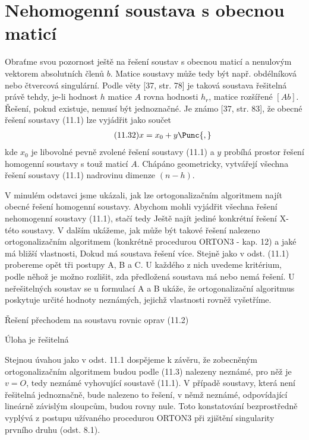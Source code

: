\section{Nehomogenní soustava s obecnou maticí}

Obraťme svou pozornost ještě na řešení soustav s obecnou
maticí \Amxn a nenulovým vektorem absolutních členů $b$. Matice
soustavy může tedy být např. obdélníková nebo čtvercová
singulární. Podle  věty [37, str. 78] je taková soustava
řešitelná právě tehdy, je-li hodnost $h$ matice $A$ rovna hodnosti
$h_r$, matice rozšířené $[A b]$. Řešení, pokud existuje, nemusí
být jednoznačné. Je známo [37, str. 83], že obecné řešení
soustavy (11.1) lze vyjádřit jako součet
%
\begin{align*}
  \tag{11.32}
  x = x_0 + y \Punc{,}
\end{align*}
%
kde $x_0$ je libovolné pevně zvolené řešení soustavy (11.1) a $y$
probíhá prostor řešení homogenní soustavy s touž maticí $A$.
Chápáno geometricky, vytvářejí všechna řešení soustavy (11.1)
nadrovinu dimenze $(n-h)$.

V minulém odstavci jsme ukázali, jak lze ortogonalizačním
algoritmem najít obecné řešení homogenní soustavy. Abychom mohli
%
vyjádřit  všechna řešení nehomogenní soustavy (11.1), stačí
tedy Ještě najít jediné konkrétní řešení X- této soustavy.
V dalším ukážeme, jak může být takové řešení nalezeno
ortogonalizačním algoritmem (konkrétně procedurou ORTON3 - kap. 12)
a jaké má bližší vlastnosti, Dokud má soustava řešení více. Stejně
jako v odst. (11.1) probereme opět tři postupy A, B a C. U každého
z nich uvedeme kritérium, podle něhož je možno rozlišit, zda
předložená soustava má nebo nemá řešení. U neřešitelných
soustav se u formulací A a B ukáže, že ortogonalizační algoritmus
poskytuje určité  hodnoty neznámých, jejichž
vlastnosti rovněž vyšetříme.

 Řešení přechodem na soustavu rovnic oprav (11.2)

  Úloha je řešitelná

Stejnou úvahou jako v odst. 11.1 dospějeme k závěru, že
zobecněným ortogonalizačním algoritmem budou podle (11.3)
nalezeny neznámé, pro něž je $v=O$, tedy neznámé vyhovující soustavě
(11.1). V případě soustavy, která není řešitelná jednoznačně,
bude nalezeno to řešení, v němž neznámé, odpovídající lineárně
závislým sloupcům, budou rovny nule. Toto konstatování
bezprostředně vyplývá z postupu užívaného procedurou ORTON3 při
zjištění singularity prvního druhu (odst. 8.1).

